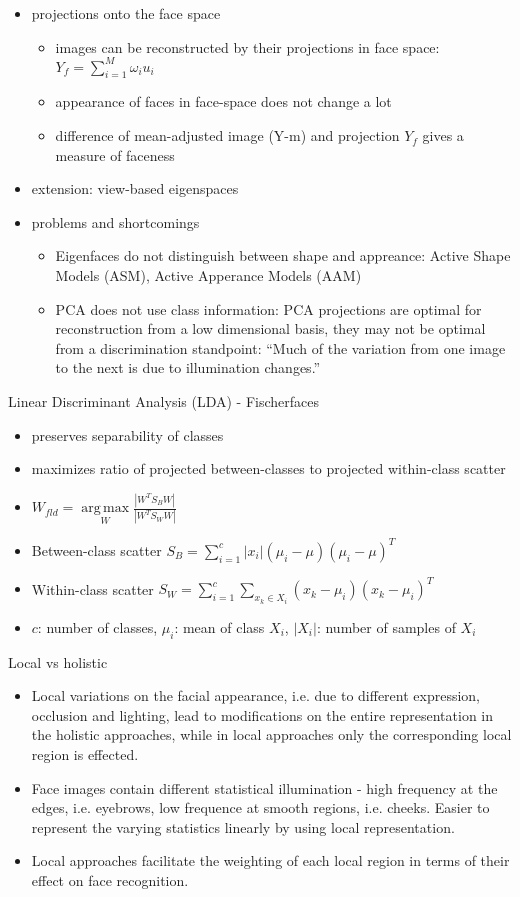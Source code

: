 \documentclass[paper=a4, fontsize=11pt]{scrartcl} %
\numberwithin{equation}{section} %
\numberwithin{figure}{section} %
\numberwithin{table}{section} %
\DeclareMathOperator*{\argmax}{arg\,max}
\begin{document}
\begin{itemize}
\item projections onto the face space
\begin{itemize}
\item images can be reconstructed by their projections in face space: $Y_f = \sum\limits_{i=1}^M \omega_i u_i$
\item appearance of faces in face-space does not change a lot
\item difference of mean-adjusted image (Y-m) and projection $Y_f$ gives a measure of faceness 
\end{itemize}
\item extension: view-based eigenspaces
\item problems and shortcomings
\begin{itemize}
\item Eigenfaces do not distinguish between shape and appreance: Active Shape Models (ASM), Active Apperance Models (AAM)
\item PCA does not use class information: PCA projections are optimal for reconstruction from a low dimensional basis, they may not be optimal from a discrimination standpoint: ``Much of the variation from one image to the next is due to illumination changes.''
\end{itemize}
\end{itemize}

Linear Discriminant Analysis (LDA) - Fischerfaces
\begin{itemize}
\item preserves separability of classes
\item maximizes ratio of projected between-classes to projected within-class scatter
\item $W_{fld} = \argmax\limits_W \frac{|W^T S_B W|}{|W^T S_W W|}$
\item Between-class scatter $S_B = \sum\limits_{i=1}^{c} |x_i| (\mu_i - \mu)(\mu_i - \mu)^T$
\item Within-class scatter $S_W = \sum\limits_{i=1}^c \sum\limits_{x_k \in X_i} (x_k - \mu_i)(x_k - \mu_i)^T$
\item $c$: number of classes, $\mu_i$: mean of class $X_i$, $|X_i|$: number of samples of $X_i$
\end{itemize}

Local vs holistic 
\begin{itemize}
\item Local variations on the facial appearance, i.e. due to different expression, occlusion and lighting, lead to modifications on the entire representation in the holistic approaches, while in local approaches only the corresponding local region is effected.
\item Face images contain different statistical illumination - high frequency at the edges, i.e. eyebrows, low frequence at smooth regions, i.e. cheeks. Easier to represent the varying statistics linearly by using local representation.
\item Local approaches facilitate the weighting of each local region in terms of their effect on face recognition.
\end{itemize}
\end{document}
